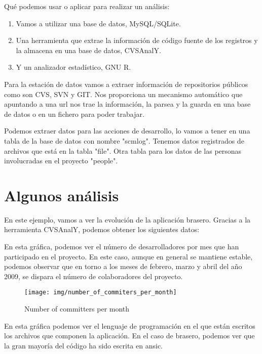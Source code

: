 Qu\'e podemos usar o aplicar para realizar un an\'alisis:
\begin{enumerate}
\item
Vamos a utilizar una base de datos, MySQL/SQLite.
\item
Una herramienta que extrae la informaci\'on de c\'odigo fuente de los registros y la almacena en una base de datos, CVSAnalY.
\item
Y un analizador estad\'istico, GNU R.
\end{enumerate}

Para la estaci\'on de datos vamos a extraer informaci\'on de repositorios p\'ublicos como son CVS, SVN y GIT. Nos proporciona un mecanismo autom\'atico que apuntando a una url nos trae la informaci\'on, la parsea y la guarda en una base de datos o en un fichero para poder trabajar.

Podemos extraer datos para las acciones de desarrollo, lo vamos a tener en una tabla de la base de datos con nombre "scmlog".
Tenemos datos registrados de archivos que est\'a en la tabla "file".
Otra tabla para los datos de las personas involucradas en el proyecto "people".

\section{Algunos an\'alisis}
En este ejemplo, vamos a ver la evoluci\'on de la aplicaci\'on brasero. Gracias a la herramienta CVSAnalY, podemos obtener los siguientes datos:

\newpage
\thispagestyle{empty}
 En esta gr\'afica, podemos ver el n\'umero de desarrolladores por mes que han participado en el proyecto. En este caso, aunque en general se mantiene estable, podemos observar que en torno a los meses de febrero, marzo y abril del año 2009, se dispara el n\'umero de colaboradores del proyecto.

\begin{figure}
  \centering
    \texttt{[image: img/number\_of\_commiters\_per\_month]}   
  \caption{Number of committers per month}
\end{figure}

\newpage
\thispagestyle{empty}
 En esta gr\'afica podemos ver el lenguaje de programaci\'on en el que est\'an escritos los archivos que componen la aplicaci\'on. En el caso de brasero, podemos ver que la gran mayor\'ia del c\'odigo ha sido escrita en ansic.

